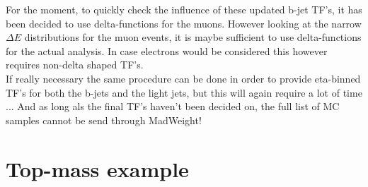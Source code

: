 For the moment, to quickly check the influence of these updated b-jet TF's, it has been decided to use delta-functions for the muons. However looking at the narrow $\Delta E$ distributions for the muon events, it is maybe sufficient to use delta-functions for the actual analysis.
In case electrons would be considered this however requires non-delta shaped TF's.\\
If really necessary the same procedure can be done in order to provide eta-binned TF's for both the b-jets and the light jets, but this will again require a lot of time ... And as long als the final TF's haven't been decided on, the full list of MC samples cannot be send through MadWeight!

\section{Top-mass example} \label{sec::TopMass}